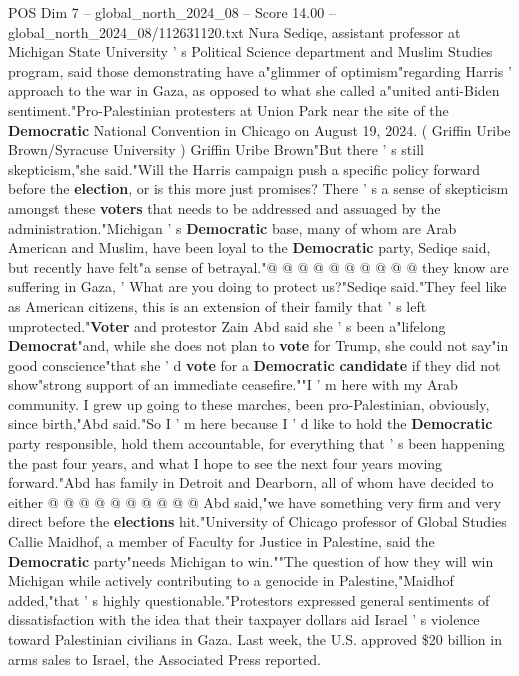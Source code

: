 \begin{textsample}{POS Dim 7 – global\_north\_2024\_08 – Score 14.00 – global\_north\_2024\_08/112631120.txt}
Nura Sediqe, assistant professor at Michigan State University ' s Political Science department and Muslim Studies program, said those demonstrating have a"glimmer of optimism"regarding Harris ' approach to the war in Gaza, as opposed to what she called a"united anti-Biden sentiment."Pro-Palestinian protesters at Union Park near the site of the \textbf{Democratic} National Convention in Chicago on August 19, 2024. ( Griffin Uribe Brown/Syracuse University ) Griffin Uribe Brown"But there ' s still skepticism,"she said."Will the Harris campaign push a specific policy forward before the \textbf{election}, or is this more just promises?
There ' s a sense of skepticism amongst these \textbf{voters} that needs to be addressed and assuaged by the administration."Michigan ' s \textbf{Democratic} base, many of whom are Arab American and Muslim, have been loyal to the \textbf{Democratic} party, Sediqe said, but recently have felt"a sense of betrayal."@ @ @ @ @ @ @ @ @ @ they know are suffering in Gaza, ' What are you doing to protect us?"Sediqe said."They feel like as American citizens, this is an extension of their family that ' s left unprotected."\textbf{Voter} and protestor Zain Abd said she ' s been a"lifelong \textbf{Democrat}"and, while she does not plan to \textbf{vote} for Trump, she could not say"in good conscience"that she ' d \textbf{vote} for a \textbf{Democratic} \textbf{candidate} if they did not show"strong support of an immediate ceasefire.""I ' m here with my Arab community.
I grew up going to these marches, been pro-Palestinian, obviously, since birth,"Abd said."So I ' m here because I ' d like to hold the \textbf{Democratic} party responsible, hold them accountable, for everything that ' s been happening the past four years, and what I hope to see the next four years moving forward."Abd has family in Detroit and Dearborn, all of whom have decided to either @ @ @ @ @ @ @ @ @ @ Abd said,"we have something very firm and very direct before the \textbf{elections} hit."University of Chicago professor of Global Studies Callie Maidhof, a member of Faculty for Justice in Palestine, said the \textbf{Democratic} party"needs Michigan to win.""The question of how they will win Michigan while actively contributing to a genocide in Palestine,"Maidhof added,"that ' s highly questionable."Protestors expressed general sentiments of dissatisfaction with the idea that their taxpayer dollars aid Israel ' s violence toward Palestinian civilians in Gaza.
Last week, the U.S. approved \$20 billion in arms sales to Israel, the Associated Press reported.

\end{textsample}
